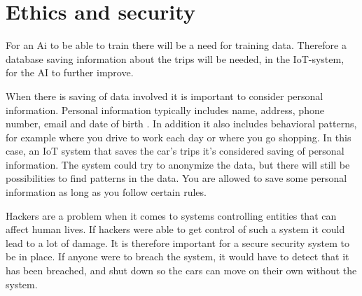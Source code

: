 \section{Ethics and security}
For an Ai to be able to train there will be a need for training data. Therefore a database saving information about the trips will be needed, in the IoT-system, for the AI to further improve.

When there is saving of data involved it is important to consider personal information. Personal information typically includes name, address, phone number, email and date of birth \parencite{datatilsynet_personopplysning}. In addition it also includes behavioral patterns, for example where you drive to work each day or where you go shopping. In this case, an IoT system that saves the car's trips it’s considered saving of personal information. The system could try to anonymize the data, but there will still be possibilities to find patterns in the data. You are allowed to save some personal information as long as you follow certain rules. 

Hackers are a problem when it comes to systems controlling entities that can affect human lives. If hackers were able to get control of such a system it could lead to a lot of damage. It is therefore important for a secure security system to be in place. If anyone were to breach the system, it would have to detect that it has been breached, and shut down so the cars can move on their own without the system.
